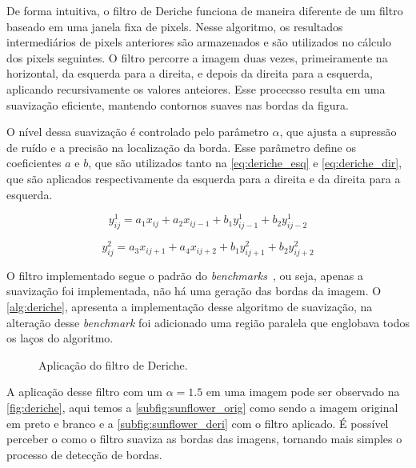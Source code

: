 De forma intuitiva, o filtro de Deriche funciona de maneira diferente de um filtro baseado em uma janela fixa de pixels. Nesse algoritmo, os resultados intermediários de pixels anteriores são armazenados e são utilizados no cálculo dos pixels seguintes. O filtro percorre a imagem duas vezes, primeiramente na horizontal, da esquerda para a direita, e depois da direita para a esquerda, aplicando recursivamente os valores anteiores. Esse procecsso resulta em uma suavização eficiente, mantendo contornos suaves nas bordas da figura.

O nível dessa suavização é controlado pelo parâmetro $\alpha$, que ajusta a supressão de ruído e a precisão na localização da borda. Esse parâmetro define os coeficientes $a$ e $b$, que são utilizados tanto na \autoref{eq:deriche_esq} e \autoref{eq:deriche_dir}, que são aplicados respectivamente da esquerda para a direita e da direita para a esquerda.

\begin{equation}
	\label{eq:deriche_esq}
	y^1_{ij} = a_1x_{ij} + a_2x_{ij - 1} + b_1y^1_{ij - 1} + b_2y^1_{ij - 2}
\end{equation}

\begin{equation}
	\label{eq:deriche_dir}
	y^2_{ij} = a_3x_{ij + 1} + a_4x_{ij + 2} + b_1y^2_{ij + 1} + b_2y^2_{ij + 2}
\end{equation}

O filtro implementado segue o padrão do \textit{benchmarks}~\cite{polybench}, ou seja, apenas a suavização foi implementada, não há uma geração das bordas da imagem. O \autoref{alg:deriche}, apresenta a implementação desse algoritmo de suavização, na alteração desse \textit{benchmark} foi adicionado uma região paralela que englobava todos os laços do algoritmo.

\begin{figure}[htbp]
	\centering
	\hfill
	\caption{Aplicação do filtro de Deriche.}
	\label{fig:deriche}
\end{figure}

A aplicação desse filtro com um $\alpha = 1.5$ em uma imagem pode ser observado na \autoref{fig:deriche}, aqui temos a \autoref{subfig:sunflower_orig} como sendo a imagem original em preto e branco e a \autoref{subfig:sunflower_deri} com o filtro aplicado. É possível perceber o como o filtro suaviza as bordas das imagens, tornando mais simples o processo de detecção de bordas.

